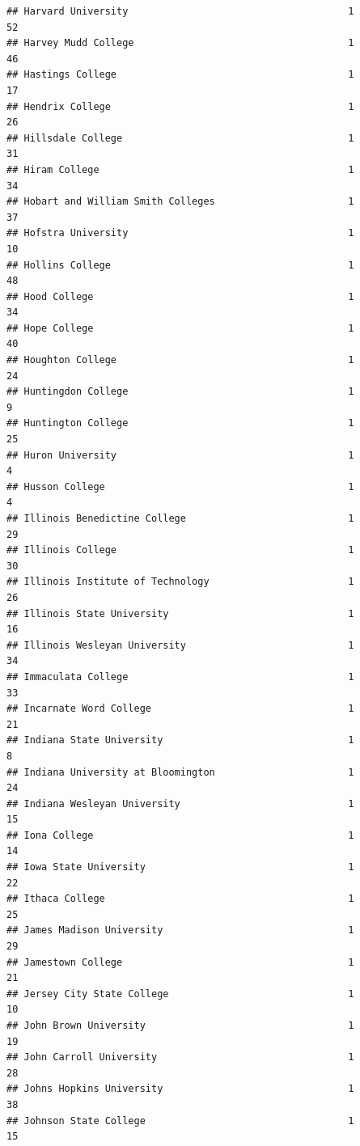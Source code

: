 \documentclass[
]{article}
\begin{document}
\begin{verbatim}
## Harvard University                                      1          52
## Harvey Mudd College                                     1          46
## Hastings College                                        1          17
## Hendrix College                                         1          26
## Hillsdale College                                       1          31
## Hiram College                                           1          34
## Hobart and William Smith Colleges                       1          37
## Hofstra University                                      1          10
## Hollins College                                         1          48
## Hood College                                            1          34
## Hope College                                            1          40
## Houghton College                                        1          24
## Huntingdon College                                      1           9
## Huntington College                                      1          25
## Huron University                                        1           4
## Husson College                                          1           4
## Illinois Benedictine College                            1          29
## Illinois College                                        1          30
## Illinois Institute of Technology                        1          26
## Illinois State University                               1          16
## Illinois Wesleyan University                            1          34
## Immaculata College                                      1          33
## Incarnate Word College                                  1          21
## Indiana State University                                1           8
## Indiana University at Bloomington                       1          24
## Indiana Wesleyan University                             1          15
## Iona College                                            1          14
## Iowa State University                                   1          22
## Ithaca College                                          1          25
## James Madison University                                1          29
## Jamestown College                                       1          21
## Jersey City State College                               1          10
## John Brown University                                   1          19
## John Carroll University                                 1          28
## Johns Hopkins University                                1          38
## Johnson State College                                   1          15

\end{verbatim}
\end{document}
